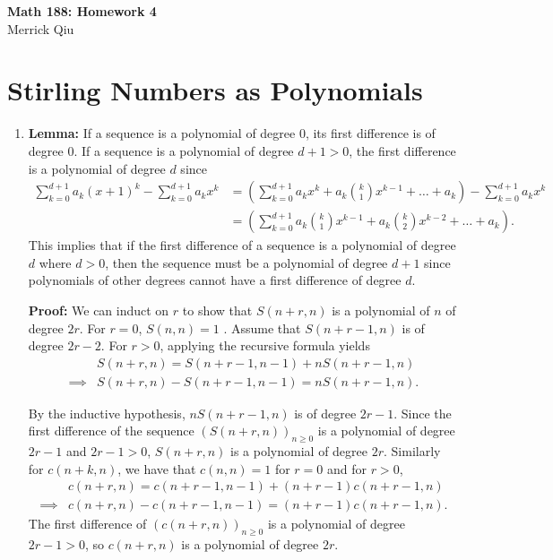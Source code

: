\documentclass{article}
\begin{document}
\begin{center}
	\huge{\bf Math 188: Homework 4} \\
	Merrick Qiu
\end{center}

\section{Stirling Numbers as Polynomials}
   \begin{enumerate}
      \item \textbf{Lemma: }
      If a sequence is a polynomial of degree $0$, 
      its first difference is of degree $0$.
      If a sequence is a polynomial of degree $d+1>0$,
      the first difference is a polynomial of degree $d$ since
      \begin{align*}
         \sum_{k=0}^{d+1} a_k(x+1)^k - \sum_{k=0}^{d+1} a_kx^k
         &= \left(\sum_{k=0}^{d+1} a_kx^k + a_k\binom{k}{1}x^{k-1} + \hdots + a_k\right) - \sum_{k=0}^{d+1} a_kx^k \\
         &=  \left(\sum_{k=0}^{d+1} a_k\binom{k}{1}x^{k-1} + a_k\binom{k}{2}x^{k-2} + \hdots + a_k\right).
      \end{align*}
      This implies that if the first difference of a sequence 
      is a polynomial of degree $d$ where $d>0$,
      then the sequence must be a polynomial of degree $d+1$ 
      since polynomials of other degrees cannot have a first difference of degree $d$.

      \textbf{Proof: }
      We can induct on $r$ to show that 
      $S(n+r, n)$ is a polynomial of $n$ of degree $2r$. 
      For $r=0$, $S(n, n) = 1$ .
      Assume that $S(n+r-1, n)$ is of degree $2r-2$.
      For $r > 0$, applying the recursive formula yields
      \begin{align*}
         &S(n+r, n) = S(n+r-1, n-1) + nS(n+r-1, n) \\
         \implies& S(n+r, n) - S(n+r-1, n-1) = nS(n+r-1, n). 
      \end{align*}
      
      By the inductive hypothesis, $nS(n+r-1, n)$ is of degree $2r-1$.
      Since the first difference of the sequence $(S(n+r, n))_{n \geq 0}$
      is a polynomial of degree $2r-1$ and $2r-1 > 0$, 
      $S(n+r, n)$ is a polynomial of degree $2r$. 
      Similarly for $c(n+k, n)$, we have that $c(n, n) = 1$ for $r=0$
      and for $r > 0$,
      \begin{align*}
         &c(n+r, n) = c(n+r-1, n-1) + (n+r-1)c(n+r-1, n) \\
         \implies& c(n+r, n) - c(n+r-1, n-1) = (n+r-1)c(n+r-1, n). 
      \end{align*}
      The first difference of $(c(n+r, n))_{n \geq 0}$
      is a polynomial of degree $2r-1>0$, so 
      $c(n+r, n)$ is a polynomial of degree $2r$. 


\end{enumerate}
\end{document}
